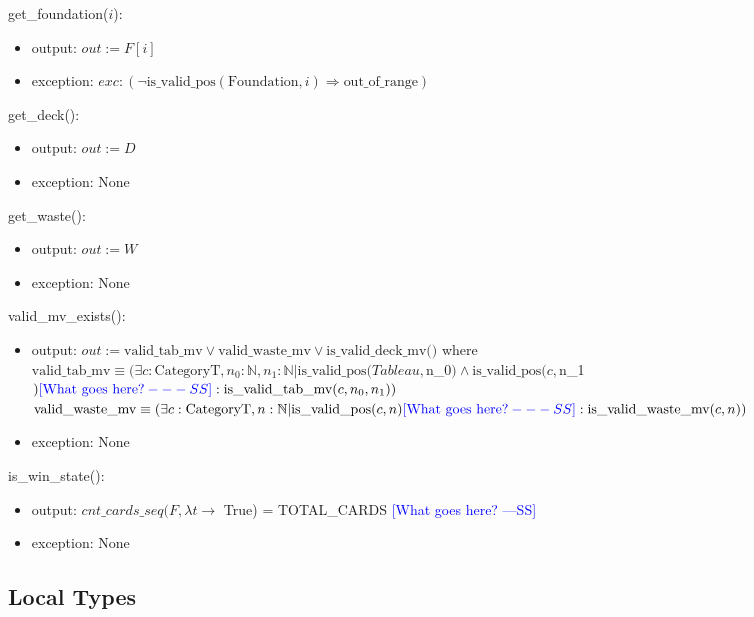 \documentclass[12pt]{article}
\newcommand{\authornote}[3]{\textcolor{#1}{[#3 ---#2]}}
\newcommand{\authornote}[3]{}
\newcommand{\wss}[1]{\authornote{blue}{SS}{#1}}
\begin{document}
\noindent get\_foundation($i$):
\begin{itemize}
\item output: $out := F[i]$
\item exception: $exc : (\neg \text{is\_valid\_pos}(\text{Foundation}, i) \Rightarrow \text{out\_of\_range})$
\end{itemize}

\noindent get\_deck():
\begin{itemize}
\item output: $out := D$
\item exception: None
\end{itemize}

\noindent get\_waste():
\begin{itemize}
\item output: $out := W$
\item exception: None
\end{itemize}

\noindent valid\_mv\_exists():
\begin{itemize}
\item output: $out := \text{valid\_tab\_mv} \vee \text{valid\_waste\_mv} \vee
  \text{is\_valid\_deck\_mv()}$ where\\

  $\text{valid\_tab\_mv} \equiv (\exists c: \text{CategoryT}, n_0: \mathbb{N},
  n_1: \mathbb{N} | \text{is\_valid\_pos}(Tableau, $n\_0$)  \wedge \text{is\_valid\_pos}(c, $n\_1$)  \\ \wss{\text{What goes here?}}: \text{is\_valid\_tab\_mv}(c, n_0, n_1))$\\

  $\text{valid\_waste\_mv} \equiv (\exists c: \text{CategoryT}, n: \mathbb{N} |\text{is\_valid\_pos}(c, n)
  \wss{\text{What goes here?}} : \text{is\_valid\_waste\_mv}(c, n))$

\item exception: None

\end{itemize}

\noindent is\_win\_state():
\begin{itemize}
\item output: $cnt\_cards\_seq(F,\lambda t \rightarrow$ True) = TOTAL\_CARDS \wss{What goes here?}

\item exception: None

\end{itemize}

\subsection*{Local Types}
\end{document}
